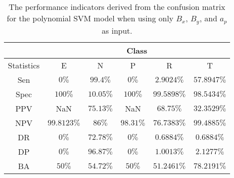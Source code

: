 \begin{table}[!ht]
	\centering
	\begin{tabular}{|c|c|c|c|c|c|}
		\hline
		 & \multicolumn{5}{c|}{Class} \\ \hline
		Statistics & E & N & P & R & T \\ \hline
		Sen & $0\%$ & $99.4\%$ & $0\%$ & $2.9024\%$ & $57.8947\%$ \\ \hline
		Spec & $100\%$ & $10.05\%$ & $100\%$ & $99.5898\%$ & $98.5434\%$ \\ \hline
		PPV & NaN & $75.13\%$ & NaN & $68.75\%$ & $32.3529\%$ \\ \hline
		NPV & $99.8123\%$ & $86\%$ & $98.31\%$ & $76.7383\%$ & $99.4885\%$ \\ \hline
		DR & $0\%$ & $72.78\%$ & $0\%$ & $0.6884\%$ & $0.6884\%$ \\ \hline
		DP & $0\%$ & $96.87\%$ & $0\%$ & $1.0013\%$ & $2.1277\%$ \\ \hline
		BA & $50\%$ & $54.72\%$ & $50\%$ & $51.2461\%$ & $78.2191\%$ \\ \hline
	\end{tabular}
	\caption{The performance indicators derived from the confusion matrix for the polynomial SVM model when using only $B_{x}$, $B_{y}$, and $a_{p}$ as input.}
	\label{tab:cs:reverse:xyap:svmPoly}
\end{table}

